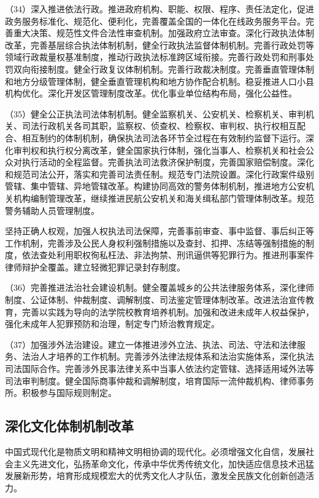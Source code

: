     （34）深入推进依法行政。推进政府机构、职能、权限、程序、责任法定化，促进政务服务标准化、规范化、便利化，完善覆盖全国的一体化在线政务服务平台。完善重大决策、规范性文件合法性审查机制。加强政府立法审查。深化行政执法体制改革，完善基层综合执法体制机制，健全行政执法监督体制机制。完善行政处罚等领域行政裁量权基准制度，推动行政执法标准跨区域衔接。完善行政处罚和刑事处罚双向衔接制度。健全行政复议体制机制。完善行政裁决制度。完善垂直管理体制和地方分级管理体制，健全垂直管理机构和地方协作配合机制。稳妥推进人口小县机构优化。深化开发区管理制度改革。优化事业单位结构布局，强化公益性。

    （35）健全公正执法司法体制机制。健全监察机关、公安机关、检察机关、审判机关、司法行政机关各司其职，监察权、侦查权、检察权、审判权、执行权相互配合、相互制约的体制机制，确保执法司法各环节全过程在有效制约监督下运行。深化审判权和执行权分离改革，健全国家执行体制，强化当事人、检察机关和社会公众对执行活动的全程监督。完善执法司法救济保护制度，完善国家赔偿制度。深化和规范司法公开，落实和完善司法责任制。规范专门法院设置。深化行政案件级别管辖、集中管辖、异地管辖改革。构建协同高效的警务体制机制，推进地方公安机关机构编制管理改革，继续推进民航公安机关和海关缉私部门管理体制改革。规范警务辅助人员管理制度。

    坚持正确人权观，加强人权执法司法保障，完善事前审查、事中监督、事后纠正等工作机制，完善涉及公民人身权利强制措施以及查封、扣押、冻结等强制措施的制度，依法查处利用职权徇私枉法、非法拘禁、刑讯逼供等犯罪行为。推进刑事案件律师辩护全覆盖。建立轻微犯罪记录封存制度。

    （36）完善推进法治社会建设机制。健全覆盖城乡的公共法律服务体系，深化律师制度、公证体制、仲裁制度、调解制度、司法鉴定管理体制改革。改进法治宣传教育，完善以实践为导向的法学院校教育培养机制。加强和改进未成年人权益保护，强化未成年人犯罪预防和治理，制定专门矫治教育规定。

    （37）加强涉外法治建设。建立一体推进涉外立法、执法、司法、守法和法律服务、法治人才培养的工作机制。完善涉外法律法规体系和法治实施体系，深化执法司法国际合作。完善涉外民事法律关系中当事人依法约定管辖、选择适用域外法等司法审判制度。健全国际商事仲裁和调解制度，培育国际一流仲裁机构、律师事务所。积极参与国际规则制定。

    \subsection{深化文化体制机制改革}

    中国式现代化是物质文明和精神文明相协调的现代化。必须增强文化自信，发展社会主义先进文化，弘扬革命文化，传承中华优秀传统文化，加快适应信息技术迅猛发展新形势，培育形成规模宏大的优秀文化人才队伍，激发全民族文化创新创造活力。

